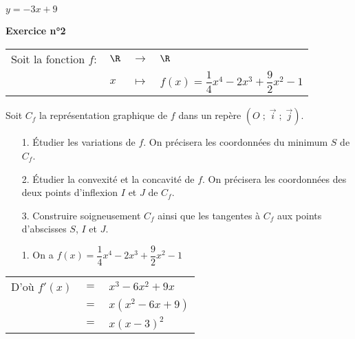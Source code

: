 $y = -3x + 9$ 

\vspace*{-5cm}

\newpage

\vspace*{-1.5cm}

\textbf{Exercice n°2} \\

\begin{tabular}{llll}
Soit la fonction $f:$ & $\R$ & $\longrightarrow$ & $\R$ \\
& $x$ & $\longmapsto$ & $f(x) = \dfrac{1}{4}x^4 - 2x^3 + \dfrac{9}{2}x^2 - 1$ \\ 
\end{tabular}

\vspace*{.3cm}

Soit $C_f$ la représentation graphique de $f$ dans un repère $\left(O \; ; \; \overrightarrow{i} \; ; \; \overrightarrow{j}\right)$. \\

\begin{itemize}
\item[1.] Étudier les variations de $f$. On précisera les coordonnées du minimum $S$ de $C_f$. \\
\item[2.] Étudier la convexité et la concavité de $f$. On précisera les coordonnées des deux points d'inflexion $I$ et $J$ de $C_f$. \\
\item[3.] Construire soigneusement $C_f$ ainsi que les tangentes à $C_f$ aux points d'abscisses $S$, $I$ et $J$. 
\end{itemize}

\vspace*{.3cm}

\begin{itemize}
\item[1.] On a $f(x) = \dfrac{1}{4}x^4 - 2x^3 + \dfrac{9}{2}x^2 - 1$ \\ 
\end{itemize}

\begin{tabular}{lll}
D'où $f'(x)$ & $ = $ & $ x^3 - 6x^2 + 9x$ \\
& $=$ & $x\left(x^2 - 6x + 9\right)$ \\
& $=$ & $x\left(x-3\right)^2$ 
\end{tabular}

\vspace*{.3cm}

